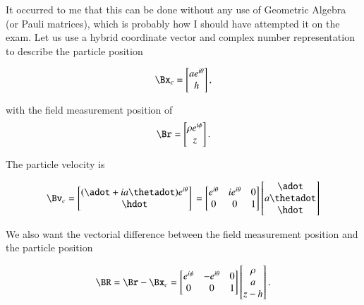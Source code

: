 {It occurred to me that this can be done without any use of Geometric Algebra (or Pauli matrices), which is probably how I should have attempted it on the exam.  Let us use a hybrid coordinate vector and complex number representation to describe the particle position

\begin{equation}\label{eqn:relativisticElectrodynamicsExamReflection:800}
\Bx_c =
\begin{bmatrix}
a e^{i\theta} \\
h
\end{bmatrix},
\end{equation}

with the field measurement position of
\begin{equation}\label{eqn:relativisticElectrodynamicsExamReflection:820}
\Br =
\begin{bmatrix}
\rho e^{i\phi} \\
z
\end{bmatrix}.
\end{equation}

The particle velocity is

\begin{equation}\label{eqn:relativisticElectrodynamicsExamReflection:840}
\Bv_c
=
\begin{bmatrix}
(\adot + i a \thetadot) e^{i\theta} \\
\hdot
\end{bmatrix} \\
=
\begin{bmatrix}
e^{i\theta} & i e^{i\theta} & 0 \\
0 & 0 & 1
\end{bmatrix}
\begin{bmatrix}
\adot \\
a \thetadot \\
\hdot
\end{bmatrix}
\end{equation}

We also want the vectorial difference between the field measurement position and the particle position

\begin{equation}\label{eqn:relativisticElectrodynamicsExamReflection:860}
\BR = \Br - \Bx_c =
\begin{bmatrix}
e^{i\phi} & -e^{i\theta} & 0 \\
0 & 0 & 1
\end{bmatrix}
\begin{bmatrix}
\rho \\
a \\
z - h
\end{bmatrix}.
\end{equation}

}
